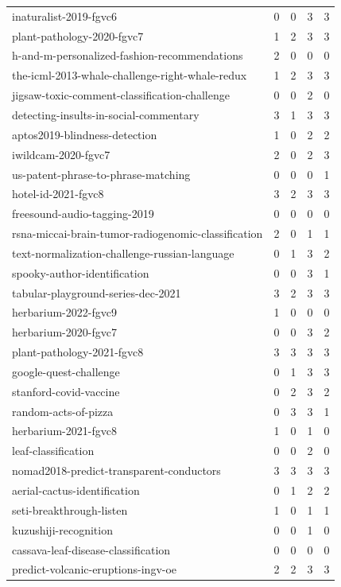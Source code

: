 {\begin{longtable}{p{6.2cm} c c c c}
\bottomrule
\endlastfoot
inaturalist-2019-fgvc6 & 0 & 0 & 3 & 3 \\
plant-pathology-2020-fgvc7 & 1 & 2 & 3 & 3 \\
h-and-m-personalized-fashion-recommendations & 2 & 0 & 0 & 0 \\
the-icml-2013-whale-challenge-right-whale-redux & 1 & 2 & 3 & 3 \\
jigsaw-toxic-comment-classification-challenge & 0 & 0 & 2 & 0 \\
detecting-insults-in-social-commentary & 3 & 1 & 3 & 3 \\
aptos2019-blindness-detection & 1 & 0 & 2 & 2 \\
iwildcam-2020-fgvc7 & 2 & 0 & 2 & 3 \\
us-patent-phrase-to-phrase-matching & 0 & 0 & 0 & 1 \\
hotel-id-2021-fgvc8 & 3 & 2 & 3 & 3 \\
freesound-audio-tagging-2019 & 0 & 0 & 0 & 0 \\
rsna-miccai-brain-tumor-radiogenomic-classification & 2 & 0 & 1 & 1 \\
text-normalization-challenge-russian-language & 0 & 1 & 3 & 2 \\
spooky-author-identification & 0 & 0 & 3 & 1 \\
tabular-playground-series-dec-2021 & 3 & 2 & 3 & 3 \\
herbarium-2022-fgvc9 & 1 & 0 & 0 & 0 \\
herbarium-2020-fgvc7 & 0 & 0 & 3 & 2 \\
plant-pathology-2021-fgvc8 & 3 & 3 & 3 & 3 \\
google-quest-challenge & 0 & 1 & 3 & 3 \\
stanford-covid-vaccine & 0 & 2 & 3 & 2 \\
random-acts-of-pizza & 0 & 3 & 3 & 1 \\
herbarium-2021-fgvc8 & 1 & 0 & 1 & 0 \\
leaf-classification & 0 & 0 & 2 & 0 \\
nomad2018-predict-transparent-conductors & 3 & 3 & 3 & 3 \\
aerial-cactus-identification & 0 & 1 & 2 & 2 \\
seti-breakthrough-listen & 1 & 0 & 1 & 1 \\
kuzushiji-recognition & 0 & 0 & 1 & 0 \\
cassava-leaf-disease-classification & 0 & 0 & 0 & 0 \\
predict-volcanic-eruptions-ingv-oe & 2 & 2 & 3 & 3 \\

\end{longtable}}
